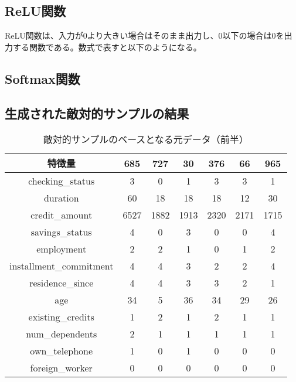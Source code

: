 \subsection*{ReLU関数}
ReLU関数は、入力が0より大きい場合はそのまま出力し、0以下の場合は0を出力する関数である。数式で表すと以下のようになる。

\subsection*{Softmax関数}

\subsection*{生成された敵対的サンプルの結果}



\begin{table}[H]
    \centering
    \caption{敵対的サンプルのベースとなる元データ（前半）}
    \begin{tabular}{|c|c|c|c|c|c|c|}
        \hline
        特徴量 & 685 & 727 & 30 & 376 & 66 & 965 \\ \hline
        checking\_status & 3 & 0 & 1 & 3 & 3 & 1 \\ \hline
        duration & 60 & 18 & 18 & 18 & 12 & 30 \\ \hline
        credit\_amount & 6527 & 1882 & 1913 & 2320 & 2171 & 1715 \\ \hline
        savings\_status & 4 & 0 & 3 & 0 & 0 & 4 \\ \hline
        employment & 2 & 2 & 1 & 0 & 1 & 2 \\ \hline
        installment\_commitment & 4 & 4 & 3 & 2 & 2 & 4 \\ \hline
        residence\_since & 4 & 4 & 3 & 3 & 2 & 1 \\ \hline
        age & 34 & 5 & 36 & 34 & 29 & 26 \\ \hline
        existing\_credits & 1 & 2 & 1 & 2 & 1 & 1 \\ \hline
        num\_dependents & 2 & 1 & 1 & 1 & 1 & 1 \\ \hline
        own\_telephone & 1 & 0 & 1 & 0 & 0 & 0 \\ \hline
        foreign\_worker & 0 & 0 & 0 & 0 & 0 & 0 \\ \hline
    \end{tabular}
\end{table}

